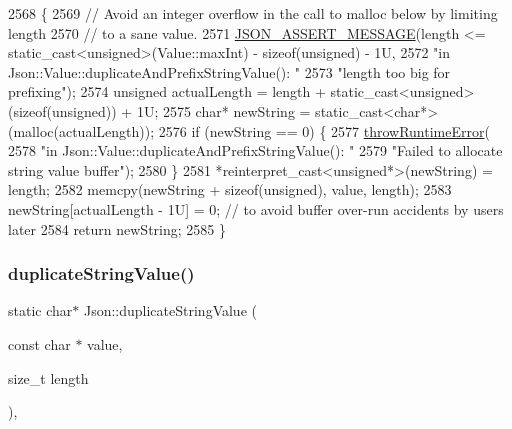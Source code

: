 \begin{DoxyCode}
2568 \{
2569   \textcolor{comment}{// Avoid an integer overflow in the call to malloc below by limiting length}
2570   \textcolor{comment}{// to a sane value.}
2571   \hyperlink{json_8h_ad7facdeeca0f495765e3b204c265eadb}{JSON\_ASSERT\_MESSAGE}(length <= static\_cast<unsigned>(Value::maxInt) - \textcolor{keyword}{sizeof}(\textcolor{keywordtype}{unsigned}) 
      - 1U,
2572                       \textcolor{stringliteral}{"in Json::Value::duplicateAndPrefixStringValue(): "}
2573                       \textcolor{stringliteral}{"length too big for prefixing"});
2574   \textcolor{keywordtype}{unsigned} actualLength = length + \textcolor{keyword}{static\_cast<}\textcolor{keywordtype}{unsigned}\textcolor{keyword}{>}(\textcolor{keyword}{sizeof}(unsigned)) + 1U;
2575   \textcolor{keywordtype}{char}* newString = \textcolor{keyword}{static\_cast<}\textcolor{keywordtype}{char}*\textcolor{keyword}{>}(malloc(actualLength));
2576   \textcolor{keywordflow}{if} (newString == 0) \{
2577     \hyperlink{namespace_json_a0ab7ff7f99788262d92d9ff3d924e065}{throwRuntimeError}(
2578         \textcolor{stringliteral}{"in Json::Value::duplicateAndPrefixStringValue(): "}
2579         \textcolor{stringliteral}{"Failed to allocate string value buffer"});
2580   \}
2581   *\textcolor{keyword}{reinterpret\_cast<}\textcolor{keywordtype}{unsigned}*\textcolor{keyword}{>}(newString) = length;
2582   memcpy(newString + \textcolor{keyword}{sizeof}(\textcolor{keywordtype}{unsigned}), value, length);
2583   newString[actualLength - 1U] = 0; \textcolor{comment}{// to avoid buffer over-run accidents by users later}
2584   \textcolor{keywordflow}{return} newString;
2585 \}
\end{DoxyCode}
\mbox{\label{namespace_json_a678ac3a60cd70ec0fb4c9abfd40eb0c4}} 
\subsubsection{\texorpdfstring{duplicate\+String\+Value()}{duplicateStringValue()}}
{\footnotesize\ttfamily static char$\ast$ Json\+::duplicate\+String\+Value (\begin{DoxyParamCaption}\item[{const char $\ast$}]{value,  }\item[{size\+\_\+t}]{length }\end{DoxyParamCaption})\hspace{0.3cm}{\ttfamily [inline]}, {\ttfamily [static]}}

